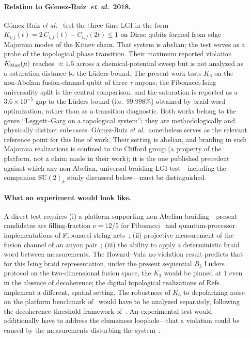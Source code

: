 \documentclass[aps,prx,reprint,amsmath,amssymb,floatfix,nofootinbib,superscriptaddress]{revtex4-2}
\begin{document}
\paragraph{Relation to G\'omez-Ruiz~\textit{et~al.}~2018.}
G\'omez-Ruiz \emph{et al.}~\cite{GomezRuiz2018} test the three-time
LGI in the form $K_{i,j}(t) = 2\,C_{i,j}(t) - C_{i,j}(2t) \leq 1$ on
Dirac qubits formed from edge Majorana modes of the Kitaev chain.
That system is abelian; the test serves as a probe of the topological
phase transition. Their maximum reported violation $K_{\rm Max}(\mu)$
reaches $\approx 1.5$ across a chemical-potential sweep but is not
analyzed as a saturation distance to the L\"uders bound. The present
work tests $K_{3}$ on the non-Abelian fusion-channel qubit of three
$\tau$ anyons; the Fibonacci-Ising universality split is the central
comparison; and the saturation is reported as a $3.6 \times 10^{-5}$
gap to the L\"uders bound (i.e.\ $99.998\%$) obtained by braid-word
optimization, rather than as a transition diagnostic. Both works
belong to the genre ``Leggett--Garg on a topological system''; they
are methodologically and physically distinct sub-cases.
G\'omez-Ruiz \emph{et al.}\ nonetheless serves as the relevant
reference point for this line of work. Their setting is abelian, and
braiding in such Majorana realizations is confined to the Clifford
group (a property of the platform, not a claim made in their work);
it is the one published precedent against
which any non-Abelian, universal-braiding LGI test---including the
companion $\mathrm{SU}(2)_k$ study discussed below---must be
distinguished.

\paragraph{What an experiment would look like.}
A direct test requires (i) a platform supporting non-Abelian
braiding---present candidates are filling-fraction $\nu = 12/5$ for
Fibonacci~\cite{NayakSimonStern2008} and quantum-processor
implementations of Fibonacci string-nets~\cite{Xu2024,Minev2025};
(ii) projective measurement of the fusion channel of an anyon
pair~\cite{Bonderson2008}; (iii) the ability to apply a deterministic
braid word between measurements. The Howard--Vala no-violation result
predicts that for this Ising braid representation, under the present
sequential $B_3$ L\"uders protocol on the two-dimensional fusion space,
the $K_{3}$ would be pinned at $1$ even in the absence of decoherence;
the digital topological realizations of
Refs.~\cite{Andersen2023,Iqbal2024} implement a different, spatial
setting.
The robustness of $K_{3}$ to depolarizing noise on the platform
benchmark of~\cite{Andersen2023} would have to be analyzed
separately, following the decoherence-threshold framework
of~\cite{Emary2013}. An experimental test would additionally have to address the clumsiness loophole---that a violation could be caused by the measurements disturbing the system~\cite{WildeMizel2012,EmaryLambertNori2014}.
\end{document}
